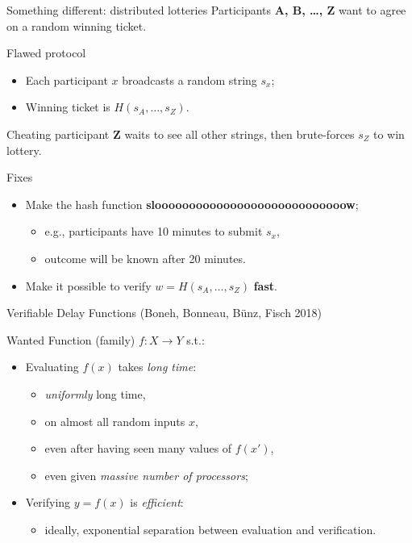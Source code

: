 \documentclass[aspectratio=169]{beamer}
\begin{document}
\begin{frame}{Something different: distributed lotteries}
  Participants \textbf{A, B, \dots, Z} want to agree on a random
  winning ticket.

  \begin{block}{Flawed protocol}
    \begin{itemize}
    \item Each participant \emph{$x$} broadcasts a random string
      \emph{$s_x$};
    \item Winning ticket is \emph{$H(s_A, \dots, s_Z)$}.
    \end{itemize}

    \pause
    
    Cheating participant \textbf{Z} waits to see all other strings,
    then brute-forces \emph{$s_Z$} to win lottery.
  \end{block}
  
  \pause

  \begin{block}{Fixes}
    \begin{itemize}
    \item Make the hash function \textbf{sloooooooooooooooooooooooooooow};
      \begin{itemize}
      \item e.g., participants have 10 minutes to submit $s_x$,
      \item outcome will be known after 20 minutes.
      \end{itemize}
    \item<4-> Make it possible to verify \emph{$w = H(s_A, \dots, s_Z)$} \textbf{fast}.
    \end{itemize}
  \end{block}
\end{frame}


\begin{frame}{Verifiable Delay Functions (Boneh, Bonneau, Bünz, Fisch 2018)}
  \begin{block}{Wanted}
    Function (family) \emph{$f:X\to Y$} s.t.:

    \begin{itemize}
    \item Evaluating $f(x)$ takes \emph{long time}:
      \begin{itemize}
      \item \emph{uniformly} long time,
      \item on almost all random inputs $x$,
      \item even after having seen many values of $f(x')$,
      \item even given \emph{massive number of processors};
      \end{itemize}
    \item Verifying $y=f(x)$ is \emph{efficient}:
      \begin{itemize}
      \item ideally, exponential separation between evaluation and
        verification.
      \end{itemize}
    \end{itemize}
  \end{block}
\end{frame}
\end{document}
